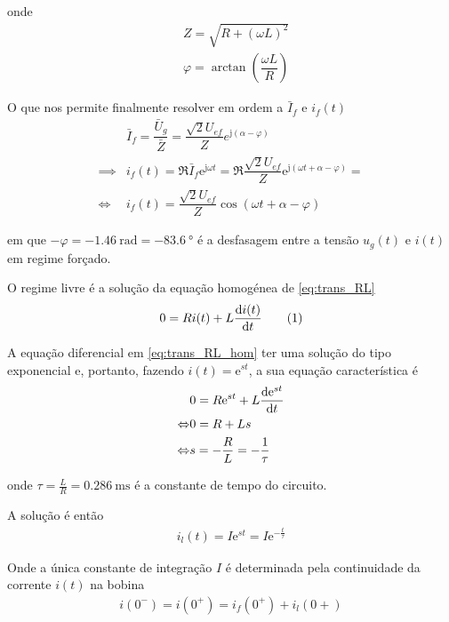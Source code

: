 \documentclass[a4paper, titlepage, portuguese]{article}
\newcommand{\eq}{\Leftrightarrow} %
\newcommand\numberthis{\addtocounter{equation}{1}\tag{\theequation}}
\newcommand\e{\mathrm{e} }
\newcommand\jj{\mathrm{j} }
\begin{document}
		\par
		onde
		\begin{align*}
			&Z = \sqrt{R + (\omega L)^2} \\
			&\varphi = \arctan\left(\dfrac{\omega L}{R}\right)
		\end{align*}
		\par
		O que nos permite finalmente resolver em ordem a $\bar{I}_f$ e $i_f(t)$
		\begin{align*}
			&\bar{I}_f = \dfrac{\bar{U}_g}{\bar{Z}} = \dfrac{\sqrt{2}U_{ef}}{Z} e^{\jj\left(\alpha - \varphi\right)} \\ \implies
			&i_f(t) = \Re{\bar{I}_f \e^{\jj \omega t}} = \Re{\dfrac{\sqrt{2}U_{ef}}{Z} \e^{\jj\left(\omega t + \alpha - \varphi\right)}} = \\ \eq
			&i_f(t) = \dfrac{\sqrt{2}U_{ef}}{Z} \cos\left(\omega t + \alpha - \varphi\right)
		\end{align*}
		\par
		em que $- \varphi = \SI{-1.46}{\radian} = \SI{-83.6}{\degree}$ é a desfasagem entre a tensão $u_g(t)$ e $i(t)$ em regime forçado.
		\par
		O regime livre é a solução da equação homogénea de \eqref{eq:trans_RL}
		\begin{align*}
			0 = R i(t) + L \dv{i(t)}{t} \numberthis \label{eq:trans_RL_hom}
		\end{align*}
		\par
		A equação diferencial em \eqref{eq:trans_RL_hom} ter uma solução do tipo exponencial e, portanto, fazendo $i(t) = \e^{st}$, a sua equação característica é
		\begin{align*}
			&0 = R\e^{st} + L\dv{\e^{st}}{t} \\ \eq
			&0 = R + Ls \\ \eq
			&s = - \dfrac{R}{L} = - \dfrac{1}{\tau}
		\end{align*}
		\par
		onde $\tau = \frac{L}{R} = \SI{0.286}{\milli\second}$ é a constante de tempo do circuito.
		\par
		A solução é então
		\begin{align*}
			i_l(t) = I \e^{st} = I \e^{-\frac{t}{\tau}}
		\end{align*}
		\par
		Onde a única constante de integração $I$ é determinada pela continuidade da corrente $i(t)$ na bobina
		\begin{align*}
			i(0^-) = i(0^+) = i_f(0^+) + i_l(0+)
		\end{align*}
		\par
\end{document}
